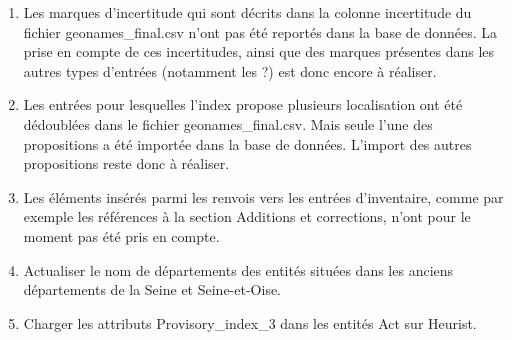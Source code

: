 \documentclass[a4paper,12pt,twoside]{book}
\begin{document}
\begin{enumerate}
		\item Les marques d'incertitude qui sont décrits dans la colonne \og incertitude\fg{} du fichier geonames\_final.csv n'ont pas été reportés dans la base de données. La prise en compte de ces incertitudes, ainsi que des marques présentes dans les autres types d'entrées (notamment les \og ?\fg{}) est donc encore à réaliser.
		
		\item Les entrées pour lesquelles l'index propose plusieurs localisation ont été dédoublées dans le fichier geonames\_final.csv. Mais seule l'une des propositions a été importée dans la base de données. L'import des autres propositions reste donc à réaliser.
		
		\item Les éléments insérés parmi les renvois vers les entrées d'inventaire, comme par exemple les références à la section \og Additions et corrections\fg{}, n'ont pour le moment pas été pris en compte.
		
		\item Actualiser le nom de départements des entités situées dans les anciens départements de la Seine et Seine-et-Oise.
		
		\item Charger les attributs \og Provisory\_index\_3\fg{} dans les entités Act sur Heurist.
		
	\end{enumerate}
	
	\backmatter
	\listoffigures
	\tableofcontents
	
\end{document}
